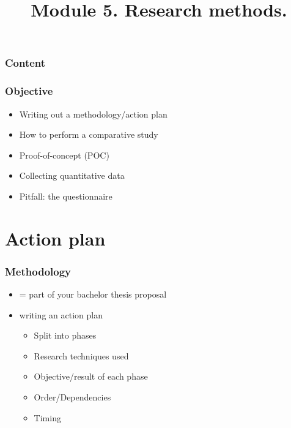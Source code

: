 \documentclass[aspectratio=169]{beamer}
\title{Module 5. Research methods.}
\subtitle{\coursename}
\author{\lecturers}   %
\date{\academicyear}
\begin{document}
\begin{frame}
  \maketitle
\end{frame}

\begin{frame}
  \frametitle{Content}

  \tableofcontents
\end{frame}

\begin{frame}
  \frametitle{Objective}

  \begin{itemize}
    \item Writing out a methodology/action plan
    \item How to perform a comparative study   
    \item Proof-of-concept (POC)
    \item Collecting quantitative data
    \item Pitfall: the questionnaire      
  \end{itemize}
\end{frame}

\section{Action plan}

\begin{frame}
  \frametitle{Methodology}

  \begin{itemize}
      \item = part of your bachelor thesis proposal
      \item writing an action plan
      \begin{itemize}
          \item Split into phases
          \item Research techniques used
          \item Objective/result of each phase
          \item Order/Dependencies
          \item Timing   
    \end{itemize}
  \end{itemize}


\end{frame}
\end{document}
